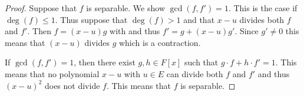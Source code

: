 \begin{proof}
  Suppose that $f$ is separable. We show $\gcd(f,f') = 1$. This is the case if $\deg(f)≤1$.  Thus suppose that $\deg(f)>1$ and that  $x-u$ divides both $f$ and $f'$. Then $f = (x-u) g$ with and thus $f'= g + (x-u) g'$. Since $g' ≠0$ this means that $(x-u)$ divides $g$ which is a contraction.

  If $\gcd(f,f') = 1$, then there exist $g,h∈ F[x]$ such that $g ⋅ f + h ⋅f'=1$. This means that no polynomial $x-u$ with $u ∈E$ can divide both $f$ and $f'$ and thus $(x-u)^2$ does not divide $f$. This means that  $f$ is separable.
\end{proof}

